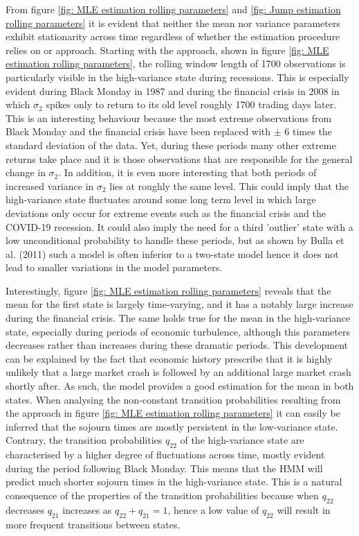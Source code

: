 From figure \ref{fig: MLE estimation rolling parameters} and \ref{fig: Jump estimation rolling parameters} it is evident that neither the mean nor variance parameters exhibit stationarity across time regardless of whether the estimation procedure relies on \mle or \jump approach. Starting with the \mle approach, shown in figure \ref{fig: MLE estimation rolling parameters}, the rolling window length of 1700 observations is particularly visible in the high-variance state during recessions. This is especially evident during Black Monday in 1987 and during the financial crisis in 2008 in which $\sigma_2$ spikes only to return to its old level roughly 1700 trading days later. This is an interesting behaviour because the most extreme observations from Black Monday and the financial crisis have been replaced with $\pm$ 6 times the standard deviation of the data. Yet, during these periods many other extreme returns take place and it is those observations that are responsible for the general change in $\sigma_2$. In addition, it is even more interesting that both periods of increased variance in $\sigma_2$ lies at roughly the same level. This could imply that the high-variance state fluctuates around some long term level in which large deviations only occur for extreme events such as the financial crisis and the COVID-19 recession. It could also imply the need for a third 'outlier' state with a low unconditional probability to handle these periods, but as shown by Bulla et al. (2011) such a model is often inferior to a two-state model hence it does not lead to smaller variations in the model parameters.

Interestingly, figure \ref{fig: MLE estimation rolling parameters} reveals that the mean for the first state is largely time-varying, and it has a notably large increase during the financial crisis. The same holds true for the mean in the high-variance state, especially during periods of economic turbulence, although this parameters decreases rather than increases during these dramatic periods. This development can be explained by the fact that economic history prescribe that it is highly unlikely that a large market crash is followed by an additional large market crash shortly after. As such, the model provides a good estimation for the mean in both states. When analysing the non-constant transition probabilities resulting from the \mle approach in figure \ref{fig: MLE estimation rolling parameters} it can easily be inferred that the sojourn times are mostly persistent in the low-variance state. Contrary, the transition probabilities $q_{22}$ of the high-variance state are characterised by a higher degree of fluctuations across time, mostly evident during the period following Black Monday. This means that the HMM will predict much shorter sojourn times in the high-variance state. This is a natural consequence of the properties of the transition probabilities because when $q_{22}$ decreases $q_{21}$ increases as $q_{22} + q_{21} = 1$, hence a low value of $q_{22}$ will result in more frequent transitions between states.

